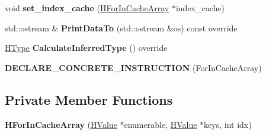 \begin{DoxyCompactItemize}
\item 
void {\bfseries set\+\_\+index\+\_\+cache} (\hyperlink{classv8_1_1internal_1_1_h_for_in_cache_array}{H\+For\+In\+Cache\+Array} $\ast$index\+\_\+cache)\hypertarget{classv8_1_1internal_1_1_h_for_in_cache_array_a3a53ec20cb4120b7db6fd47615a88449}{}\label{classv8_1_1internal_1_1_h_for_in_cache_array_a3a53ec20cb4120b7db6fd47615a88449}

\item 
std\+::ostream \& {\bfseries Print\+Data\+To} (std\+::ostream \&os) const  override\hypertarget{classv8_1_1internal_1_1_h_for_in_cache_array_a8d4bd82bb1882281bd09133b2ead7764}{}\label{classv8_1_1internal_1_1_h_for_in_cache_array_a8d4bd82bb1882281bd09133b2ead7764}

\item 
\hyperlink{classv8_1_1internal_1_1_h_type}{H\+Type} {\bfseries Calculate\+Inferred\+Type} () override\hypertarget{classv8_1_1internal_1_1_h_for_in_cache_array_a798e96b2e9a2021bcdfdec42793a3519}{}\label{classv8_1_1internal_1_1_h_for_in_cache_array_a798e96b2e9a2021bcdfdec42793a3519}

\item 
{\bfseries D\+E\+C\+L\+A\+R\+E\+\_\+\+C\+O\+N\+C\+R\+E\+T\+E\+\_\+\+I\+N\+S\+T\+R\+U\+C\+T\+I\+ON} (For\+In\+Cache\+Array)\hypertarget{classv8_1_1internal_1_1_h_for_in_cache_array_aeae68a5bef5dc7ad2298b0d5cb35e128}{}\label{classv8_1_1internal_1_1_h_for_in_cache_array_aeae68a5bef5dc7ad2298b0d5cb35e128}

\end{DoxyCompactItemize}
\subsection*{Private Member Functions}
\begin{DoxyCompactItemize}
\item 
{\bfseries H\+For\+In\+Cache\+Array} (\hyperlink{classv8_1_1internal_1_1_h_value}{H\+Value} $\ast$enumerable, \hyperlink{classv8_1_1internal_1_1_h_value}{H\+Value} $\ast$keys, int idx)\hypertarget{classv8_1_1internal_1_1_h_for_in_cache_array_ab4c34f64d5c331bbe853d5888e2a6689}{}\label{classv8_1_1internal_1_1_h_for_in_cache_array_ab4c34f64d5c331bbe853d5888e2a6689}

\end{DoxyCompactItemize}
